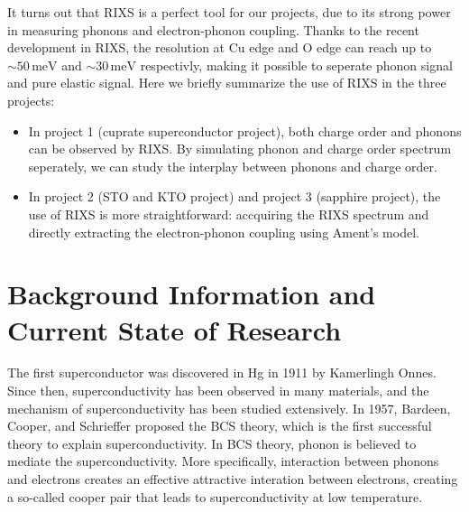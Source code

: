 \documentclass[11pt]{article}
\begin{document}
It turns out that RIXS is a perfect tool for our projects, due to its strong power in measuring phonons and electron-phonon coupling. Thanks to the recent development in RIXS, the resolution at $\mathrm{Cu}$ edge and $\mathrm{O}$ edge can reach up to $\sim 50\,\mathrm{meV}$ and $\sim 30\,\mathrm{meV}$ respectivly, making it possible to seperate phonon signal and pure elastic signal. Here we briefly summarize the use of RIXS in the three projects:
\begin{itemize}
  \item In project 1 (cuprate superconductor project), both charge order and phonons can be observed by RIXS. By simulating phonon and charge order spectrum seperately, we can study the interplay between phonons and charge order. 
  \item In project 2 (STO and KTO project) and project 3 (sapphire project), the use of RIXS is more straightforward: accquiring the RIXS spectrum and directly extracting the electron-phonon coupling using Ament's model.
\end{itemize}

\section{Background Information and Current State of Research}

The first superconductor was discovered in Hg in 1911 by Kamerlingh Onnes. Since then, superconductivity has been observed in many materials, and the mechanism of superconductivity has been studied extensively. In 1957, Bardeen, Cooper, and Schrieffer proposed the BCS theory, which is the first successful theory to explain superconductivity\cite{bardeen_theory_1957}. In BCS theory, phonon is believed to mediate the superconductivity. More specifically, interaction between phonons and electrons creates an effective attractive interation between electrons, creating a so-called cooper pair that leads to superconductivity at low temperature\cite{bardeen_theory_1957}. 
\end{document}
